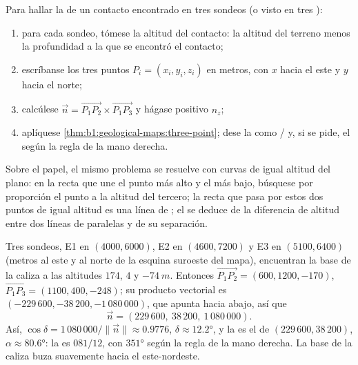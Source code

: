 \begin{method}\label{met:b1:geological-maps:three-point}
Para hallar la  de un contacto encontrado en tres sondeos (o visto en tres ):
\begin{enumerate}
  \item para cada sondeo, tómese la altitud del contacto: la altitud del terreno menos la
        profundidad a la que se encontró el contacto;
  \item escríbanse los tres puntos $P_i = (x_i, y_i, z_i)$ en metros, con $x$ hacia el este y
        $y$ hacia el norte;
  \item calcúlese $\vec n = \overrightarrow{P_1P_2} \times
        \overrightarrow{P_1P_3}$ y hágase positivo $n_z$;
  \item aplíquese \cref{thm:b1:geological-maps:three-point}; dese la  como / y, si se pide, el  según la regla de la mano derecha.
\end{enumerate}
Sobre el papel, el mismo problema se resuelve con curvas de igual altitud del plano: en la
recta que une el punto más alto y el más bajo, búsquese por proporción el punto a la altitud del
tercero; la recta que pasa por estos dos puntos de igual altitud es una línea de ; el
 se deduce de la diferencia de altitud entre dos líneas de  paralelas y de su
separación.
\end{method}

\begin{example}\label{ex:b1:geological-maps:east}
Tres sondeos, E1 en $(4000, 6000)$, E2 en $(4600, 7200)$ y E3 en $(5100, 6400)$ (metros al este y
al norte de la esquina suroeste del mapa), encuentran la base de la caliza a las altitudes $174$,
$4$ y $\qty{-74}{m}$. Entonces $\overrightarrow{P_1P_2} = (600, 1200, -170)$,
$\overrightarrow{P_1P_3} = (1100, 400, -248)$; su producto vectorial es
$(-229\,600, -38\,200, -1\,080\,000)$, que apunta hacia abajo, así que
\[
  \vec n = (229\,600,\ 38\,200,\ 1\,080\,000).
\]
Así, $\cos\delta = 1\,080\,000/\|\vec n\| \approx
0.9776$, $\delta \approx \ang{12.2}$, y la  es el  de
$(229\,600, 38\,200)$, $\alpha \approx \ang{80.6}$: la  es
$081/12$, con  $\ang{351}$ según la regla de la mano derecha. La base de la caliza buza
suavemente hacia el este-nordeste.
\end{example}

